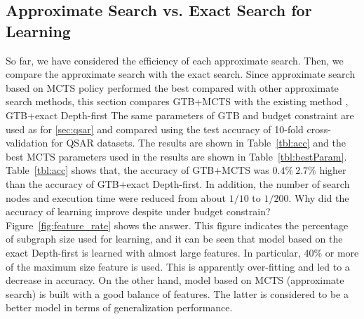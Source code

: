 \subsection{Approximate Search vs. Exact Search for Learning}
So far, we have considered the efficiency of each approximate search.
Then, we compare the approximate search with the exact search.
Since approximate search based on MCTS policy performed the best 
compared with other approximate search methods, 
this section compares GTB+MCTS with the existing method \cite{Shirakawa:2018}, GTB+exact Depth-first
The same parameters of GTB and budget constraint are used as for \ref{sec:qsar}
and compared using the test accuracy of 10-fold cross-validation for QSAR datasets.
The results are shown in Table~\ref{tbl:acc} 
and the best MCTS parameters used in the results are shown in Table~\ref{tbl:bestParam}.
Table~\ref{tbl:acc} shows that, the accuracy of GTB+MCTS was $0.4\%~2.7\%$ higher than 
the accuracy of GTB+exact Depth-first.
In addition, the number of search nodes and execution time were reduced from about $1/10$ to $1/200$.
Why did the accuracy of learning improve despite under budget constrain?
Figure~\ref{fig:feature_rate} shows the answer.
This figure indicates the percentage of subgraph size used for learning,
and it can be seen that model based on the exact Depth-first is learned with almost large features.
In particular, 40\% or more of the maximum size feature is used.
This is apparently over-fitting and led to a decrease in accuracy.
On the other hand, model based on MCTS (approximate search) is built with a good balance of features.
The latter is considered to be a better model in terms of generalization performance.

